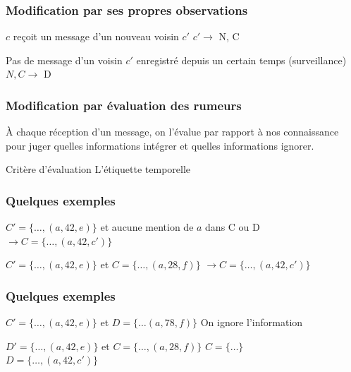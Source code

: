 \documentclass{beamer}
\begin{document}
\begin{frame}

  \frametitle{Modification par ses propres observations}

  \begin{block}{$c$ reçoit un message d'un nouveau voisin $c'$}
    $c' \rightarrow$ N, C
  \end{block}

  \vfill

  \begin{block}{Pas de message d'un voisin $c'$ enregistré depuis un
      certain temps (surveillance)}
    $N, C \rightarrow$ D
  \end{block}

\end{frame}

\begin{frame}

  \frametitle{Modification par évaluation des rumeurs}

  \`A chaque réception d'un message, on l'évalue par rapport à nos
  connaissance pour juger quelles informations intégrer et quelles
  informations ignorer.

  \vfill

  \begin{block}{Critère d'évaluation}
    L'étiquette temporelle
  \end{block}

\end{frame}

\begin{frame}

  \frametitle{Quelques exemples}

  \begin{block}{$C'=\{\dots,(a,42,e)\}$ et aucune mention de $a$ dans C ou
    D}
      $\rightarrow C = \{\dots,(a,42,c')\}$
  \end{block}

  \vfill

  \begin{block}{$C'=\{\dots,(a,42,e)\}$ et $C=\{\dots,(a,28,f)\}$}
      $\rightarrow C = \{\dots,(a,42,c')\}$
  \end{block}

\end{frame}

\begin{frame}

  \frametitle{Quelques exemples}

  \begin{block}{$C'=\{\dots,(a,42,e)\}$ et $D=\{\dots(a,78,f)\}$}
      On ignore l'information
  \end{block}

  \vfill

  \begin{block}{$D'=\{\dots,(a,42,e)\}$ et $C=\{\dots,(a,28,f)\}$}
    $C = \{\dots\}$\\
    $D = \{\dots,(a,42,c')\}$
  \end{block}

\end{frame}
\end{document}
